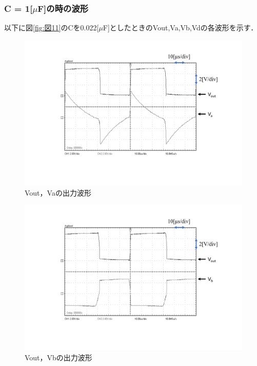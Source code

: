 \documentclass[10pt, a4j, dvipdfmx]{jarticle}
\makeatletter
\newcommand{\figcaption}[1]{\def\@captype{figure}\caption{#1}}
\makeatother
\begin{document}
\subsubsection{C = 1[$\mu$F]の時の波形}
以下に図\ref{fig:図11}のCを0.022[$\mu$F]としたときのVout,Va,Vb,Vdの各波形を示す．
\begin{figure}[H]
	\centering
	\includegraphics[width=\hsize]{images/223kc-Vout-Va.png}
	\figcaption{Vout，Vaの出力波形}
	\label{223kc-Vout-Va}
\end{figure}
\begin{figure}[H]
	\centering
	\includegraphics[width=\hsize]{images/223kc-Vout-Vb.png}
	\figcaption{Vout，Vbの出力波形}
	\label{223kc-Vout-Vb}
\end{figure}
\end{document}

